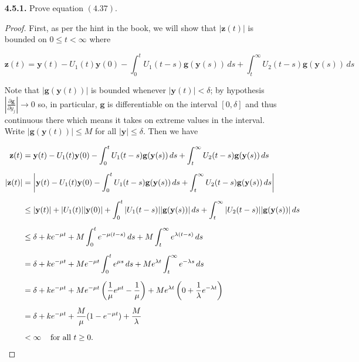 \documentclass[11pt,oneside,english]{amsart}
\theoremstyle{definition}
\newcommand{\pp}[2]{\frac{\partial{#1}}{\partial{#2}}}
\begin{document}
\rightline{\today}



\vspace{1cm}
\begin{enumerate}





\item[\textbf{4.5.1.}] Prove equation $(4.37)$.

\begin{proof}
First, as per the hint in the book, we will show that $|\mathbf{z}(t)|$ is bounded on $0\leq t<\infty$ where 

\[
\mathbf{z}(t)=\mathbf{y}(t)-U_1(t)\mathbf{y}(0)-\int_0^tU_1(t-s)\mathbf{g}(\mathbf{y}(s))\,ds+\int_t^\infty U_2(t-s)\mathbf{g}(\mathbf{y}(s))\,ds
\]

Note that $|\mathbf{g}(\mathbf{y}(t))|$ is bounded whenever $|\mathbf{y}(t)|<\delta$; by hypothesis $\left|\pp{\mathbf{g}}{y_j}\right|\rightarrow 0$ so, in particular, $\mathbf{g}$ is differentiable on the interval $[0,\delta]$ and thus continuous there which means it takes on extreme values in the interval. Write $|\mathbf{g}(\mathbf{y}(t))|\leq M$ for all $|\mathbf{y}|\leq \delta$. Then we have

\begin{align*}
\mathbf{z}(t)&=\mathbf{y}(t)-U_1(t)\mathbf{y}(0)-\int_0^tU_1(t-s)\mathbf{g}(\mathbf{y}(s))\,ds+\int_t^\infty U_2(t-s)\mathbf{g}(\mathbf{y}(s))\,ds\\[2mm]
|\mathbf{z}(t)|&=\left|\mathbf{y}(t)-U_1(t)\mathbf{y}(0)-\int_0^tU_1(t-s)\mathbf{g}(\mathbf{y}(s))\,ds+\int_t^\infty U_2(t-s)\mathbf{g}(\mathbf{y}(s))\,ds\right|\\[2mm]
&\leq|\mathbf{y}(t)|+|U_1(t)||\mathbf{y}(0)|+\int_0^t|U_1(t-s)||\mathbf{g}(\mathbf{y}(s))|\,ds+\int_t^\infty |U_2(t-s)||\mathbf{g}(\mathbf{y}(s))|\,ds\\[2mm]
&\leq\delta+ke^{-\mu t}+M\int_0^te^{-\mu(t-s)}\,ds+M\int_t^\infty e^{\lambda(t-s)}\,ds\\[2mm]
&=\delta+ke^{-\mu t}+Me^{-\mu t}\int_0^te^{\mu s}\,ds+Me^{\lambda t}\int_t^\infty e^{-\lambda s}\,ds\\[2mm]
&=\delta+ke^{-\mu t}+Me^{-\mu t}\left(\frac{1}{\mu}e^{\mu t}-\frac{1}{\mu}\right)+Me^{\lambda t}\left(0+\frac{1}{\lambda}e^{-\lambda t}\right)\\[2mm]
&=\delta+ke^{-\mu t}+\frac{M}{\mu}(1-e^{-\mu t})+\frac{M}{\lambda}\\[2mm]
&<\infty \hspace{3mm}\text{ for all $t\geq0$.}
\end{align*}



\end{proof}
\end{enumerate}
\end{document}
